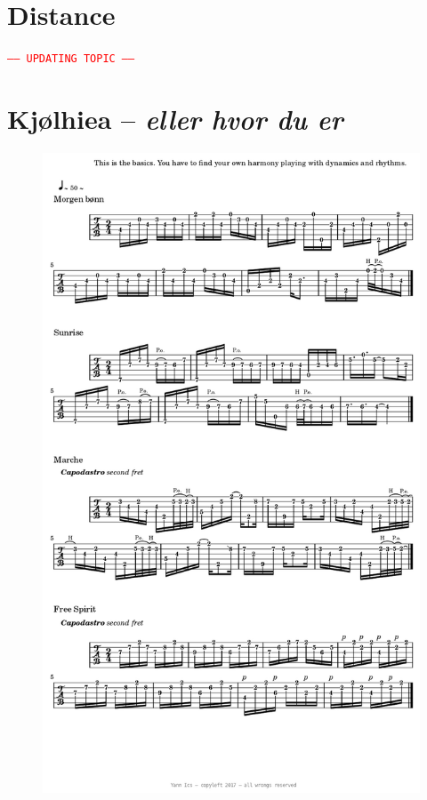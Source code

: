 \documentclass{book}
\begin{document}


\newpage
\section{Distance}
\label{dist}
\vspace{2cm}
\texttt{\textcolor{red}{----- UPDATING TOPIC -----}}

\newpage
\section{Kj{\o}lhiea -- \textsl{eller hvor du er}}
\begin{figure}[H]
\begin{center}
\includegraphics[scale=0.31]{img/5572}
\label{kj}
\end{center}
\end{figure}
\end{document}
